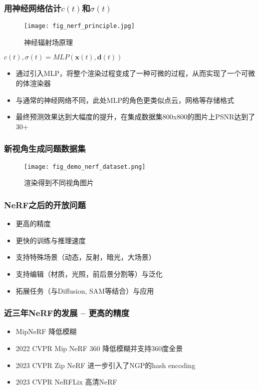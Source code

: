
\begin{frame}
    \frametitle{用神经网络估计$c(t)$和$\sigma(t)$}
    \begin{figure}[H]
        \centering
        \texttt{[image: fig\_nerf\_principle.jpg]}
        \caption{神经辐射场原理}
        \label{fig:nerf_principle}
    \end{figure}
    $c(t),\sigma(t)=MLP(\mathbf{x}(t),\mathbf{d}(t))$
    \begin{itemize}
        \item 通过引入MLP，将整个渲染过程变成了一种可微的过程，从而实现了一个可微的体渲染器
        \item 与通常的神经网络不同，此处MLP的角色更类似点云，网格等存储格式
        \item 最终预测效果达到大幅度的提升，在集成数据集800x800的图片上PSNR达到了30+
    \end{itemize}
\end{frame}

\begin{frame}
    \frametitle{新视角生成问题数据集}
    \begin{figure}[H]
        \texttt{[image: fig\_demo\_nerf\_dataset.png]}
        \caption[short]{渲染得到不同视角图片}
    \end{figure}
\end{frame}

\begin{frame}
    \frametitle{NeRF之后的开放问题}
    \begin{itemize}
        \item 更高的精度
        \item 更快的训练与推理速度
        \item 支持特殊场景（动态，反射，暗光，大场景）
        \item 支持编辑（材质，光照，前后景分割等）与泛化
        \item 拓展任务（与Diffusion, SAM等结合）与应用
    \end{itemize}
\end{frame}

\begin{frame}
    \frametitle{近三年NeRF的发展 -- 更高的精度}
    \begin{itemize}
        \item MipNeRF \cite{barronMipNeRFMultiscaleRepresentation2021} 降低模糊
        \item 2022 CVPR Mip NeRF 360 \cite{barronMipNeRF360Unbounded2022} 降低模糊并支持360度全景
        \item 2023 CVPR Zip NeRF \cite{barronZipNeRFAntiAliasedGridBased2023} 进一步引入了NGP的hash encoding
        \item 2023 CVPR NeRFLix \cite{zhouNeRFLiXHighQualityNeural2023} 高清NeRF
    \end{itemize}
\end{frame}


